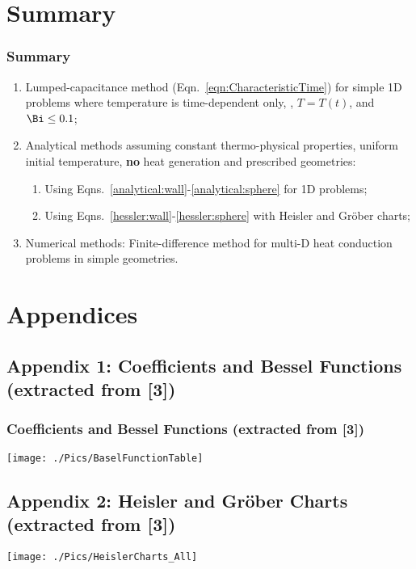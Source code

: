 \documentclass[10pt,compress,handout,unknownkeysallowed]{beamer}
\begin{document}
\section{Summary} 


\begin{frame}
  \frametitle{Summary}
    \begin{enumerate}  
       \item Lumped-capacitance method (Eqn.~\ref{eqn:CharacteristicTime}) for simple 1D problems where temperature is time-dependent only, \ie , $T=T(t)$, and $\Bi \leq 0.1$;  
       \item Analytical methods assuming constant thermo-physical properties, uniform initial temperature, {\bf no} heat generation and prescribed geometries:
           \begin{enumerate}
              \item Using Eqns.~\ref{analytical:wall}-\ref{analytical:sphere} for 1D problems;
              \item Using Eqns.~\ref{hessler:wall}-\ref{hessler:sphere} with Heisler and Gr\"ober charts;
            \end{enumerate}
       \item Numerical methods: Finite-difference method for multi-D heat conduction problems in simple geometries.
    \end{enumerate}
\end{frame}


\section{Appendices}

\subsection{Appendix 1: Coefficients and Bessel Functions (extracted from [3])}\label{appendix1}
\begin{frame}
 \frametitle{Coefficients and Bessel Functions (extracted from [3])}
        \begin{center}
          \texttt{[image: ./Pics/BaselFunctionTable]}
        \end{center}
\end{frame}


\subsection{Appendix 2: Heisler and Gr\"ober Charts (extracted from [3])}\label{appendix2}
          \texttt{[image: ./Pics/HeislerCharts\_All]}
{
  
}
\end{document}
